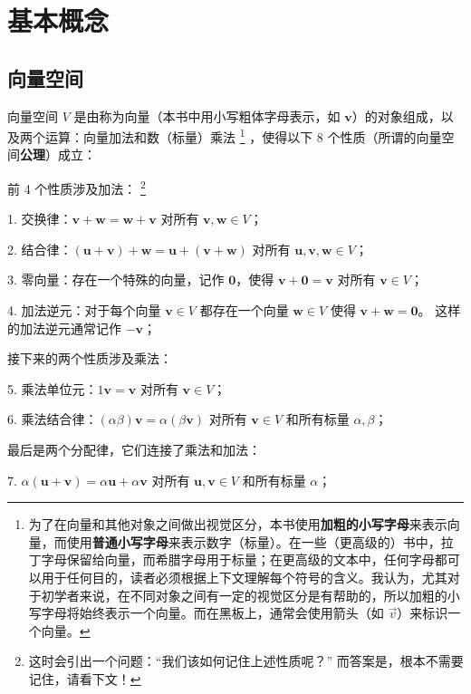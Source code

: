 

\chapter{基本概念}\label{chap:Intro}

\section{向量空间}\label{sec:background}


向量空间 $V$ 是由称为向量（本书中用小写粗体字母表示，如 $\mathbf{v}$）的对象组成，以及两个运算：向量加法和数（标量）乘法
\footnote{为了在向量和其他对象之间做出视觉区分，本书使用\textbf{加粗的小写字母}来表示向量，而使用\textbf{普通小写字母}来表示数字（标量）。在一些（更高级的）书中，拉丁字母保留给向量，而希腊字母用于标量；在更高级的文本中，任何字母都可以用于任何目的，读者必须根据上下文理解每个符号的含义。我认为，尤其对于初学者来说，在不同对象之间有一定的视觉区分是有帮助的，所以加粗的小写字母将始终表示一个向量。而在黑板上，通常会使用箭头（如 $\vec{v}$）来标识一个向量。
}
，使得以下 8 个性质（所谓的向量空间\textbf{公理}）成立：

前 4 个性质涉及加法：
\footnote{
这时会引出一个问题：“我们该如何记住上述性质呢？” 而答案是，根本不需要记住，请看下文！
}

1. 交换律：$\mathbf{v} + \mathbf{w} = \mathbf{w} + \mathbf{v}$ 对所有 $\mathbf{v}, \mathbf{w} \in V$；

2. 结合律：$(\mathbf{u} + \mathbf{v}) + \mathbf{w} = \mathbf{u} + (\mathbf{v} + \mathbf{w})$ 对所有 $\mathbf{u}, \mathbf{v}, \mathbf{w} \in V$；

3. 零向量：存在一个特殊的向量，记作 $\mathbf{0}$，使得 $\mathbf{v} + \mathbf{0} = \mathbf{v}$ 对所有 $\mathbf{v} \in V$；

4. 加法逆元：对于每个向量 $\mathbf{v} \in V$ 都存在一个向量 $\mathbf{w} \in V$ 使得 $\mathbf{v} + \mathbf{w} = \mathbf{0}$。 这样的加法逆元通常记作 $-\mathbf{v}$；

接下来的两个性质涉及乘法：

5. 乘法单位元：$1 \mathbf{v} = \mathbf{v}$ 对所有 $\mathbf{v} \in V$；

6. 乘法结合律：$(\alpha\beta) \mathbf{v} = \alpha(\beta \mathbf{v})$ 对所有 $\mathbf{v} \in V$ 和所有标量 $\alpha, \beta$；

最后是两个分配律，它们连接了乘法和加法：

7. $\alpha (\mathbf{u} + \mathbf{v}) = \alpha \mathbf{u} + \alpha \mathbf{v}$ 对所有 $\mathbf{u}, \mathbf{v} \in V$ 和所有标量 $\alpha$；

